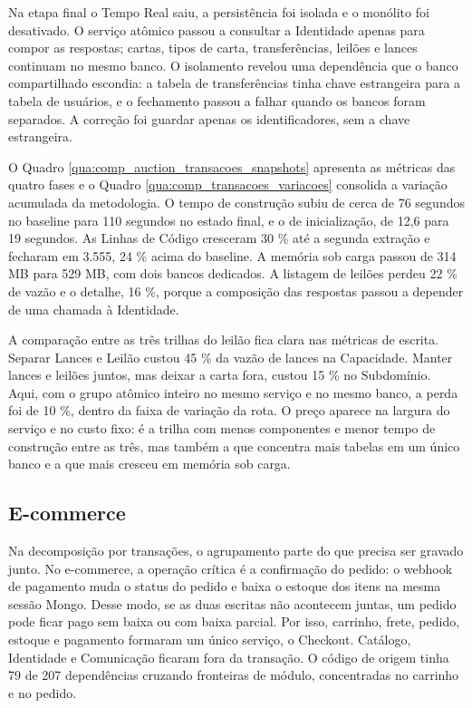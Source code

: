 Na etapa final o Tempo Real saiu, a persistência foi isolada e o monólito foi desativado. O serviço atômico passou a consultar a Identidade apenas para compor as respostas; cartas, tipos de carta, transferências, leilões e lances continuam no mesmo banco. O isolamento revelou uma dependência que o banco compartilhado escondia: a tabela de transferências tinha chave estrangeira para a tabela de usuários, e o fechamento passou a falhar quando os bancos foram separados. A correção foi guardar apenas os identificadores, sem a chave estrangeira.

O Quadro \ref{qua:comp_auction_transacoes_snapshots} apresenta as métricas das quatro fases e o Quadro \ref{qua:comp_transacoes_variacoes} consolida a variação acumulada da metodologia. O tempo de construção subiu de cerca de 76 segundos no baseline para 110 segundos no estado final, e o de inicialização, de 12,6 para 19 segundos. As Linhas de Código cresceram 30 \% até a segunda extração e fecharam em 3.555, 24 \% acima do baseline. A memória sob carga passou de 314 MB para 529 MB, com dois bancos dedicados. A listagem de leilões perdeu 22 \% de vazão e o detalhe, 16 \%, porque a composição das respostas passou a depender de uma chamada à Identidade.

A comparação entre as três trilhas do leilão fica clara nas métricas de escrita. Separar Lances e Leilão custou 45 \% da vazão de lances na Capacidade. Manter lances e leilões juntos, mas deixar a carta fora, custou 15 \% no Subdomínio. Aqui, com o grupo atômico inteiro no mesmo serviço e no mesmo banco, a perda foi de 10 \%, dentro da faixa de variação da rota. O preço aparece na largura do serviço e no custo fixo: é a trilha com menos componentes e menor tempo de construção entre as três, mas também a que concentra mais tabelas em um único banco e a que mais cresceu em memória sob carga.



\subsection*{E-commerce}

Na decomposição por transações, o agrupamento parte do que precisa ser gravado junto. No e-commerce, a operação crítica é a confirmação do pedido: o webhook de pagamento muda o status do pedido e baixa o estoque dos itens na mesma sessão Mongo. Desse modo, se as duas escritas não acontecem juntas, um pedido pode ficar pago sem baixa ou com baixa parcial. Por isso, carrinho, frete, pedido, estoque e pagamento formaram um único serviço, o Checkout. Catálogo, Identidade e Comunicação ficaram fora da transação. O código de origem tinha 79 de 207 dependências cruzando fronteiras de módulo, concentradas no carrinho e no pedido.

